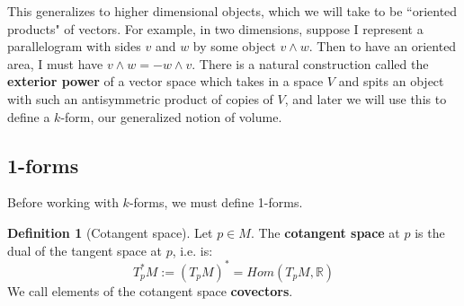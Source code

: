 \documentclass[11pt, oneside]{article}   	%
\theoremstyle{definition}
\newtheorem{definition}{Definition}[section]
\begin{document}
This generalizes to higher dimensional objects, which we will take to be ``oriented products" of vectors. 
For example, in two dimensions, suppose I represent a parallelogram with sides $v$ and $w$ by some object $v\wedge w$. 
Then to have an oriented area, I must have $v\wedge w = -w\wedge v$. There is a natural construction called the 
\textbf{exterior power} of a vector space which takes in a space $V$ and spits an object with such an antisymmetric product 
of copies of $V$, and later we will use this to define a $k$-form, our generalized notion of volume. 

\subsection{1-forms}

Before working with $k$-forms, we must define 1-forms. 
\begin{definition}[Cotangent space]
	Let $p\in M$. The \textbf{cotangent space} at $p$ is the dual of the tangent space at $p$, i.e. is:
	\begin{equation}
		T_p^* M := (T_p M)^* = Hom(T_p M, \mathbb R)
	\end{equation}
	We call elements of the cotangent space \textbf{covectors}.
\end{definition}
\end{document}
